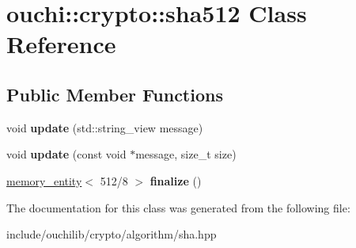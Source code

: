 \hypertarget{classouchi_1_1crypto_1_1sha512}{}\section{ouchi\+::crypto\+::sha512 Class Reference}
\label{classouchi_1_1crypto_1_1sha512}
\subsection*{Public Member Functions}
\begin{DoxyCompactItemize}
\item 
\mbox{\label{classouchi_1_1crypto_1_1sha512_a7f8d5da8b66005ccd43ca497f3a7920a}} 
void {\bfseries update} (std\+::string\+\_\+view message)
\item 
\mbox{\label{classouchi_1_1crypto_1_1sha512_ac0934cdbdac30ec2f1ebe921c90118ac}} 
void {\bfseries update} (const void $\ast$message, size\+\_\+t size)
\item 
\mbox{\label{classouchi_1_1crypto_1_1sha512_a2e0812c44de59c4eadcaa8765d9e03c2}} 
\mbox{\hyperlink{structouchi_1_1crypto_1_1memory__entity}{memory\+\_\+entity}}$<$ 512/8 $>$ {\bfseries finalize} ()
\end{DoxyCompactItemize}


The documentation for this class was generated from the following file\+:\begin{DoxyCompactItemize}
\item 
include/ouchilib/crypto/algorithm/sha.\+hpp\end{DoxyCompactItemize}
